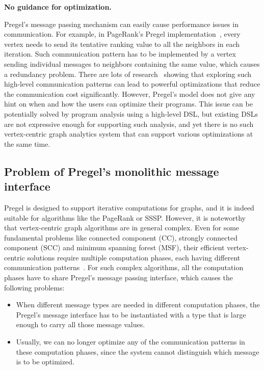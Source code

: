 \documentclass{sokendai_thesis} %
\begin{document}
\textbf{No guidance for optimization.}

Pregel's message passing mechanism can easily cause performance issues in communication.
For example, in PageRank's Pregel implementation~\cite{pregel}, every vertex needs to send its tentative ranking value to all the neighbors in each iteration.
Such communication pattern has to be implemented by a vertex sending individual messages to neighbors containing the same value, which causes a redundancy problem.
There are lots of research~\cite{xpregel,gps,distrgraphlab,yan2015effective} showing that exploring such high-level communication patterns can lead to powerful optimizations that reduce the communication cost significantly.
However, Pregel's model does not give any hint on when and how the users can optimize their programs.
This issue can be potentially solved by program analysis using a high-level DSL, but existing DSLs are not expressive enough for supporting such analysis, and yet there is no such vertex-centric graph analytics system that can support various optimizations at the same time.


\subsection{Problem of Pregel's monolithic message interface}
\label{sec:problem-of-pregel}

Pregel is designed to support iterative computations for graphs, and it is indeed suitable for algorithms like the PageRank or SSSP.
However, it is noteworthy that vertex-centric graph algorithms are in general complex.
Even for some fundamental problems like connected component (CC), strongly connected component (SCC) and minimum spanning forest (MSF), their efficient vertex-centric solutions require multiple computation phases, each having different communication patterns~\cite{yan2015effective,optimizing}.
For such complex algorithms, all the computation phases have to share Pregel's message passing interface, which causes the following problems:
\begin{itemize}
 \item When different message types are needed in different computation phases, the Pregel's message interface has to be instantiated with a type that is large enough to carry all those message values.
 \item Usually, we can no longer optimize any of the communication patterns in these computation phases, since the system cannot distinguish which message is to be optimized.
\end{itemize}
\end{document}
